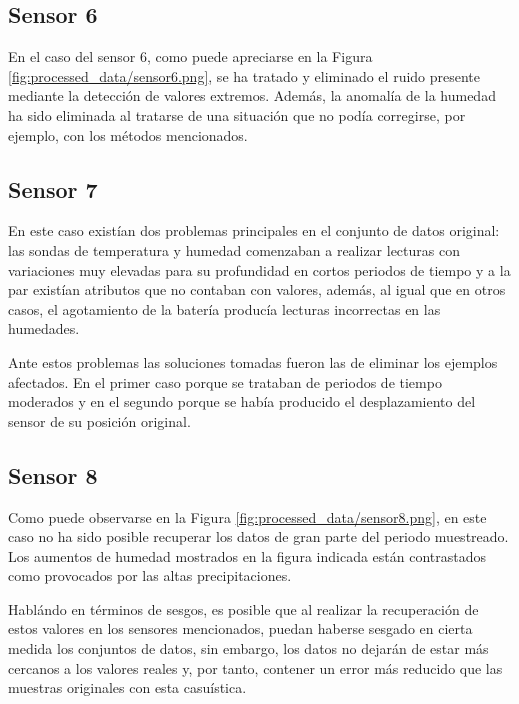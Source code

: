 \subsection{Sensor 6}

En el caso del sensor 6, como puede apreciarse en la Figura 
\ref{fig:processed_data/sensor6.png}, se ha tratado y eliminado el ruido presente 
mediante la detección de valores extremos. Además, la anomalía de la humedad ha sido
eliminada al tratarse de una situación que no podía corregirse, por ejemplo, con los
métodos mencionados.

\newpage

\subsection{Sensor 7}

En este caso existían dos problemas principales en el conjunto de datos original:
las sondas de temperatura y humedad comenzaban a realizar lecturas con variaciones
muy elevadas para su profundidad en cortos periodos de tiempo y a la par
existían atributos que no contaban con valores, además, al igual que en otros casos,
el agotamiento de la batería producía lecturas incorrectas en las humedades.

Ante estos problemas las soluciones tomadas fueron las de eliminar los ejemplos 
afectados. En el primer caso porque se trataban de periodos de tiempo moderados y 
en el segundo porque se había producido el desplazamiento del sensor de su posición 
original.

\newpage

\subsection{Sensor 8}

Como puede observarse en la Figura \ref{fig:processed_data/sensor8.png}, en este caso
no ha sido posible recuperar los datos de gran parte del periodo muestreado.
Los aumentos de humedad mostrados en la figura indicada están contrastados como 
provocados por las altas precipitaciones.

Hablándo en términos de sesgos, es posible que al realizar la recuperación de estos
valores en los sensores mencionados, puedan haberse sesgado en cierta medida
los conjuntos de datos, sin embargo, los datos no dejarán de estar más cercanos a los
valores reales y, por tanto, contener un error más reducido que las muestras originales
con esta casuística.